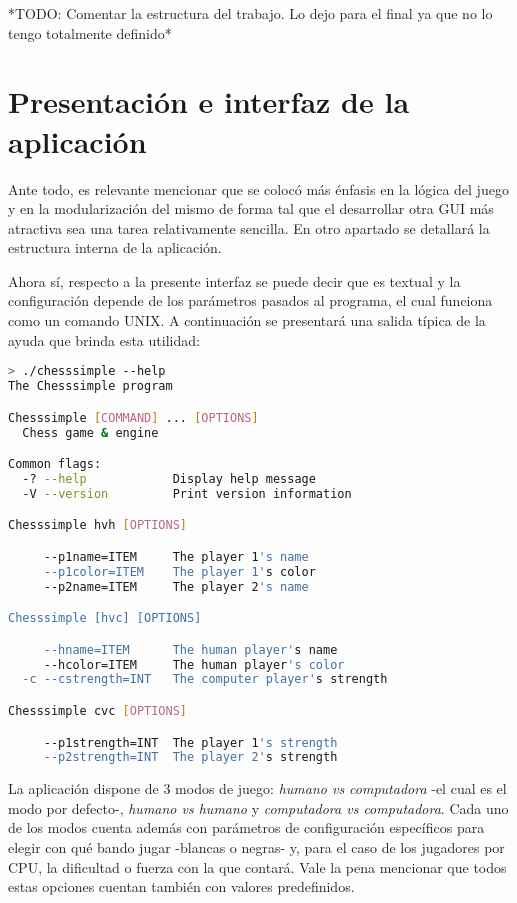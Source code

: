 \documentclass{llncs}
\begin{document}
*TODO: Comentar la estructura del trabajo. Lo dejo para el final ya que no lo tengo totalmente definido*

\section{Presentación e interfaz de la aplicación}

Ante todo, es relevante mencionar que se colocó más énfasis en la lógica del juego y en la modularización del mismo de forma tal que el desarrollar otra GUI más atractiva sea una tarea relativamente sencilla. En otro apartado se detallará la estructura interna de la aplicación.

Ahora sí, respecto a la presente interfaz se puede decir que es textual y la configuración depende de los parámetros pasados al programa, el cual funciona como un comando UNIX. A continuación se presentará una salida típica de la ayuda que brinda esta utilidad:

\begin{lstlisting}[backgroundcolor=\color{lightgray}, language=bash, caption=Ayuda de la aplicación, label={lst:ayuda_programa}]
> ./chesssimple --help
The Chesssimple program

Chesssimple [COMMAND] ... [OPTIONS]
  Chess game & engine

Common flags:
  -? --help            Display help message
  -V --version         Print version information

Chesssimple hvh [OPTIONS]

     --p1name=ITEM     The player 1's name
     --p1color=ITEM    The player 1's color
     --p2name=ITEM     The player 2's name

Chesssimple [hvc] [OPTIONS]

     --hname=ITEM      The human player's name
     --hcolor=ITEM     The human player's color
  -c --cstrength=INT   The computer player's strength

Chesssimple cvc [OPTIONS]

     --p1strength=INT  The player 1's strength
     --p2strength=INT  The player 2's strength
\end{lstlisting}

La aplicación dispone de 3 modos de juego: \textit{humano vs computadora} -el cual es el modo por defecto-, \textit{humano vs humano} y \textit{computadora vs computadora}. Cada uno de los modos cuenta además con parámetros de configuración específicos para elegir con qué bando jugar -blancas o negras- y, para el caso de los jugadores por CPU, la dificultad o fuerza con la que contará. Vale la pena mencionar que todos estas opciones cuentan también con valores predefinidos.
\end{document}
